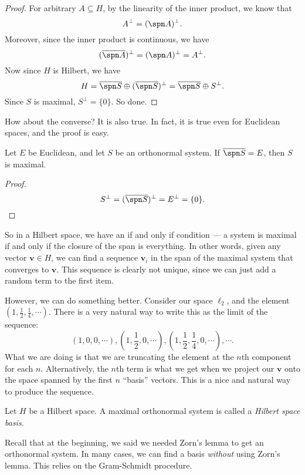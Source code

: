 \documentclass[a4paper]{article}
\begin{document}
\begin{proof}
  For arbitrary $A \subseteq H$, by the linearity of the inner product, we know that
  \[
    A^\perp = (\spn A)^\perp.
  \]
  Moreover, since the inner product is continuous, we have
  \[
    (\overline{\spn A})^\perp = (\spn A)^\perp = A^\perp.
  \]
  Now since $H$ is Hilbert, we have
  \[
    H = \overline{\spn S} \oplus (\overline{\spn S})^\perp = \overline{\spn S} \oplus S^\perp.
  \]
  Since $S$ is maximal, $S^\perp = \{0\}$. So done.
\end{proof}

How about the converse? It is also true. In fact, it is true even for Euclidean spaces, and the proof is easy.

\begin{prop}
  Let $E$ be Euclidean, and let $S$ be an orthonormal system. If $\overline{\spn S} = E$, then $S$ is maximal.
\end{prop}

\begin{proof}
  \[
    S^\perp = (\overline{\spn S})^\perp = E^\perp = \{0\}.
  \]
\end{proof}
So in a Hilbert space, we have an if and only if condition --- a system is maximal if and only if the closure of the span is everything. In other words, given any vector $\mathbf{v} \in H$, we can find a sequence $\mathbf{v}_i$ in the span of the maximal system that converges to $\mathbf{v}$. This sequence is clearly not unique, since we can just add a random term to the first item.

However, we can do something better. Consider our space $\ell_2$, and the element $(1, \frac{1}{2}, \frac{1}{4}, \cdots)$. There is a very natural way to write this as the limit of the sequence:
\[
  (1, 0, 0, \cdots), \left(1, \frac{1}{2}, 0, \cdots\right), \left(1, \frac{1}{2}, \frac{1}{4}, 0, \cdots\right), \cdots.
\]
What we are doing is that we are truncating the element at the $n$th component for each $n$. Alternatively, the $n$th term is what we get when we project our $\mathbf{v}$ onto the space spanned by the first $n$ ``basis'' vectors. This is a nice and natural way to produce the sequence.

\begin{defi}
  Let $H$ be a Hilbert space. A maximal orthonormal system is called a \emph{Hilbert space basis}.
\end{defi}

Recall that at the beginning, we said we needed Zorn's lemma to get an orthonormal system. In many cases, we can find a basis \emph{without} using Zorn's lemma. This relies on the Gram-Schmidt procedure.
\end{document}
